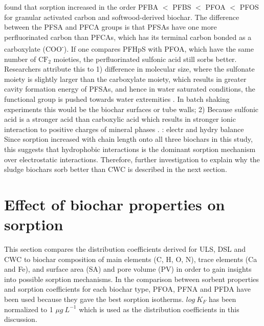 \cite{zhang2021sorption} found that sorption increased in the order PFBA $<$ PFBS $<$ PFOA $<$ PFOS for granular activated carbon and softwood-derived biochar. The difference between the PFSA and PFCA groups is that PFSAs have one more perfluorinated carbon than PFCAs, which has its terminal carbon bonded as a carboxylate (COO\textsuperscript{-}). If one compares PFHpS with PFOA, which have the same number of $\mathrm{CF_2}$ moieties, the perfluorinated sulfonic acid still sorbs better. Researchers attribute this to 1) difference in molecular size, where the sulfonate moiety is slightly larger than the carboxylate moiety, which results in greater cavity formation energy of PFSAs, and hence in water saturated conditions, the functional group is pushed towards water extremities \citep{yin2022insights,sigmund2022sorption}. In batch shaking experiments this would be the biochar surfaces or tube walls; 2) Because sulfonic acid is a stronger acid than carboxylic acid which results in stronger ionic interaction to positive charges of mineral phases \citep{arvaniti2015review}. \cite{du2014adsorption}: electr and hydry balance Since sorption increased with chain length onto all three biochars in this study, this suggests that hydrophobic interactions is the dominant sorption mechanism over electrostatic interactions. Therefore, further investigation to explain why the sludge biochars sorb better than CWC is described in the next section. 


\section{Effect of biochar properties on sorption}
This section compares the distribution coefficients derived for ULS, DSL and CWC to biochar composition of main elements (C, H, O, N), trace elements (Ca and Fe), and surface area (SA) and pore volume (PV) in order to gain insights into possible sorption mechanisms. In the comparison between sorbent properties and sorption coefficients for each biochar type, PFOA, PFNA and PFDA have been used because they gave the best sorption isotherms. $log~K_F$ has been normalized to 1 $\mu g~L^{-1}$ which is used as the distribution coefficients in this discussion.

